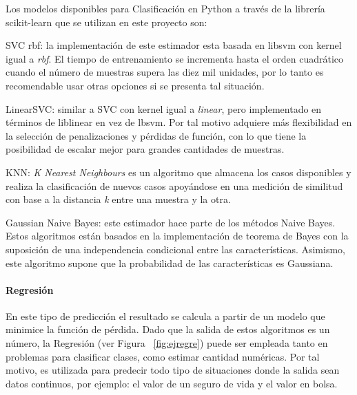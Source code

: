 Los modelos disponibles para Clasificación en Python a través de la librería scikit-learn \parencite{sklearn_api} que se utilizan en este proyecto son:

\begin{APAitemize}
    \item SVC rbf: la implementación de este estimador esta basada en libsvm con kernel igual a \textit{rbf}. El tiempo de entrenamiento se incrementa hasta el orden cuadrático cuando el número de muestras supera las diez mil unidades, por lo tanto es recomendable usar otras opciones si se presenta tal situación.
    \item LinearSVC: similar a SVC con kernel igual a \textit{linear}, pero implementado en términos de liblinear en vez de lbsvm. Por tal motivo adquiere más flexibilidad en la selección de penalizaciones y pérdidas de función, con lo que tiene la posibilidad de escalar mejor para grandes cantidades de muestras.
    \item KNN: \textit{K Nearest Neighbours} es un algoritmo que almacena los casos disponibles y realiza la clasificación de nuevos casos apoyándose en una medición de similitud con base a la distancia \textit{k} entre una muestra y la otra.
    \item Gaussian Naive Bayes: este estimador hace parte de los métodos Naive Bayes. Estos algoritmos están basados en la implementación de teorema de Bayes con la suposición de una independencia condicional entre las características. Asimismo, este algoritmo supone que la probabilidad de las características es Gaussiana.
\end{APAitemize}

\paragraph{Regresión} En este tipo de predicción el resultado se calcula a partir de un modelo que minimice la función de pérdida. Dado que la salida de estos algoritmos es un número, la Regresión (ver Figura ~\ref{fig:ejregre}) puede ser empleada tanto en problemas para clasificar clases, como estimar cantidad numéricas. Por tal motivo, es utilizada para predecir todo tipo de situaciones donde la salida sean datos continuos, por ejemplo: el valor de un seguro de vida y el valor en bolsa. 

